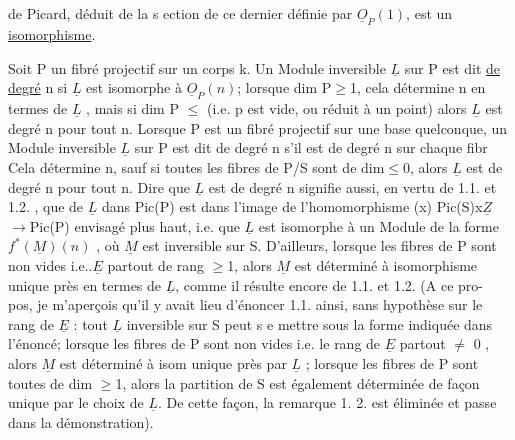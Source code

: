 de Picard, déduit de la s ection de ce dernier définie par $\underline{O}_P(1)$, est un
\uline{isomorphisme}.

Soit P un fibré projectif sur un corps k. Un Module inversible
$\underline{L}$ sur P est dit \uline{de degré} n si $\underline{L}$ est isomorphe à $\underline{O}_P(n)$; lorsque
dim P$\geq$1, cela détermine n en termes de $\underline{L}$ , mais si dim P $\leq$ 
(i.e. p est vide, ou réduit à un point) alors $\underline{L}$ est degré n pour tout n.
Lorsque P est un fibré projectif sur une base quelconque, un Module
inversible $\underline{L}$ sur P est dit de degré n s'il est de degré n sur chaque fibr
Cela détermine n, sauf si toutes les fibres de P/S sont de dim$\leq$0, alors
$\underline{L}$ est de degré n pour tout n. Dire que $\underline{L}$ est de degré n signifie aussi,
en vertu de 1.1. et 1.2. , que   de $\underline{L}$ dans Pic(P) est dans
l'image de  l'homomorphisme (x) Pic(S)x$\underline{Z}$ $\longrightarrow$Pic(P) envisagé plus haut,
i.e. que $\underline{L}$ est isomorphe à un Module de la forme $f^*(\underline{M})(n)$ , où $\underline{M}$ est
inversible sur S. D'ailleurs, lorsque les fibres de P sont non vides
i.e..$\underline{E}$ partout de rang $\geq$1, alors $\underline{M}$ est déterminé à isomorphisme unique
près en termes de $\underline{L}$, comme il résulte encore de 1.1. et 1.2. (A ce pro-%
pos, je m'aperçois qu'il y avait lieu d'énoncer 1.1. ainsi, sans hypothèse
sur le rang de $\underline{E}$ : tout $\underline{L}$ inversible sur S peut s e mettre sous la forme
indiquée dans l'énoncé; lorsque les fibres de P sont non vides i.e. le
rang de $\underline{E}$ partout $\neq$ 0 , alors $\underline{M}$ est déterminé à isom unique près par
$\underline{L}$ ; lorsque les fibres de P sont toutes de dim $\geq$1,  alors la partition
de S est également déterminée de façon unique par le choix de $\underline{L}$. De cette
façon, la remarque 1. 2. est éliminée et passe dans la démonstration).

